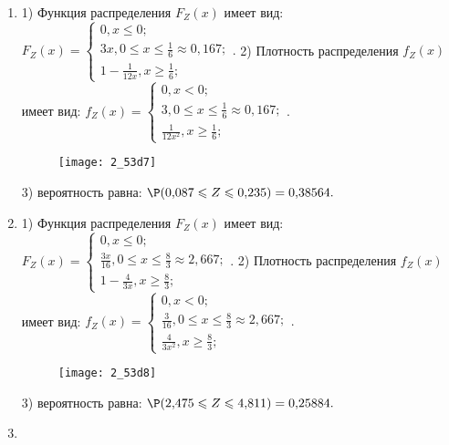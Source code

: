 \documentclass[a4paper,12pt]{article}
\begin{document}
\begin{enumerate}
\item


1) Функция распределения $F_Z(x)$ имеет вид:
$
F_Z(x)=\left\{
\begin{array}{l}
0, x\leqslant 0;\\
3 x, 0\leqslant x\leqslant \frac{1}{6}\approx 0,\!167;\\
1 - \frac{1}{12 x}, x\geqslant\frac{1}{6};
\end{array}.
\right.
$
2) Плотность распределения $f_Z(x)$ имеет вид:
$
f_Z(x)=\left\{
\begin{array}{l}
0, x<0;\\
3, 0\leqslant x\leqslant \frac{1}{6}\approx 0,\!167;\\
\frac{1}{12 x^{2}}, x\geqslant\frac{1}{6};
\end{array}.
\right.
$


\begin{figure}[H]
    \texttt{[image: 2\_53d7]}
\end{figure}


3) вероятность равна:
$
\P(0,\!087\leqslant Z\leqslant 0,\!235)=
0,\!38564.
$



\item


1) Функция распределения $F_Z(x)$ имеет вид:
$
F_Z(x)=\left\{
\begin{array}{l}
0, x\leqslant 0;\\
\frac{3 x}{16}, 0\leqslant x\leqslant \frac{8}{3}\approx 2,\!667;\\
1 - \frac{4}{3 x}, x\geqslant\frac{8}{3};
\end{array}.
\right.
$
2) Плотность распределения $f_Z(x)$ имеет вид:
$
f_Z(x)=\left\{
\begin{array}{l}
0, x<0;\\
\frac{3}{16}, 0\leqslant x\leqslant \frac{8}{3}\approx 2,\!667;\\
\frac{4}{3 x^{2}}, x\geqslant\frac{8}{3};
\end{array}.
\right.
$


\begin{figure}[H]
    \texttt{[image: 2\_53d8]}
\end{figure}


3) вероятность равна:
$
\P(2,\!475\leqslant Z\leqslant 4,\!811)=
0,\!25884.
$



\item



\end{enumerate}
\end{document}
